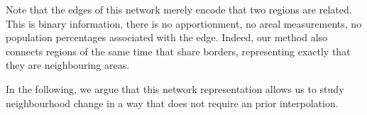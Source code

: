 Note that the edges of this network merely encode that two regions are related.
This is binary information, there is no apportionment, no areal measurements,
no population percentages associated with the edge. Indeed, our method also
connects regions of the same time that share borders, representing exactly that
they are neighbouring areas.

In the following, we argue that this network representation allows us to study neighbourhood change in a way that does not require an prior interpolation. 
